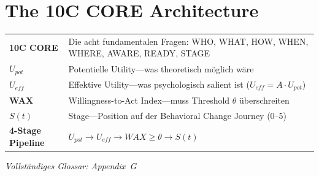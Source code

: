 %
%
%
%

\section{The 10C CORE Architecture}
\label{sec:10c-core}

\begin{tcolorbox}[colback=gray!5!white, colframe=gray!75!black,
    title=\textbf{Begriffe in diesem Kapitel}]

\small
\begin{tabular}{@{}p{3cm}p{9.5cm}@{}}
\textbf{10C CORE} & Die acht fundamentalen Fragen: WHO, WHAT, HOW, WHEN, WHERE, AWARE, READY, STAGE \\[3pt]
\textbf{$U_{pot}$} & Potentielle Utility---was theoretisch möglich wäre \\[3pt]
\textbf{$U_{eff}$} & Effektive Utility---was psychologisch salient ist ($U_{eff} = A \cdot U_{pot}$) \\[3pt]
\textbf{WAX} & Willingness-to-Act Index---muss Threshold $\theta$ überschreiten \\[3pt]
\textbf{$S(t)$} & Stage---Position auf der Behavioral Change Journey (0--5) \\[3pt]
\textbf{4-Stage Pipeline} & $U_{pot} \rightarrow U_{eff} \rightarrow WAX \geq \theta \rightarrow S(t)$ \\
\end{tabular}

\vspace{3pt}
\textit{Vollständiges Glossar: Appendix~G}
\end{tcolorbox}

